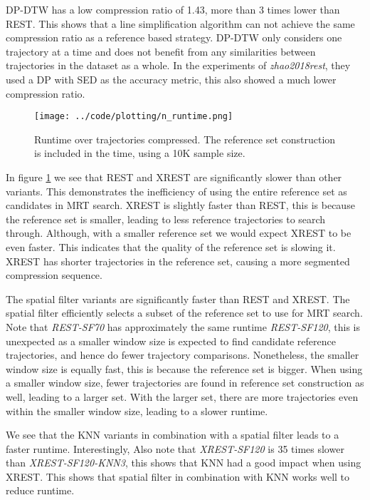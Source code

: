 DP-DTW has a low compression ratio of 1.43, more than 3 times lower than REST. This shows that a line simplification algorithm can not achieve the same compression ratio as a reference based strategy. DP-DTW only considers one trajectory at a time and does not benefit from any similarities between trajectories in the dataset as a whole. In the experiments of \textit{zhao2018rest}, they used a DP with SED as the accuracy metric, this also showed a much lower compression ratio.

\begin{figure}[h]
    \begin{minipage}{0.99\linewidth}
        \centering
        \texttt{[image: ../code/plotting/n\_runtime.png]}
        \caption{Runtime over trajectories compressed. The reference set construction is included in the time, using a 10K sample size.}
        \label{fig:n_runtime}
    \end{minipage}
\end{figure}

In figure \ref{fig:n_runtime} we see that REST and XREST are significantly slower than other variants. This demonstrates the inefficiency of using the entire reference set as candidates in MRT search. XREST is slightly faster than REST, this is because the reference set is smaller, leading to less reference trajectories to search through. Although, with a smaller reference set we would expect XREST to be even faster. This indicates that the quality of the reference set is slowing it. XREST has shorter trajectories in the reference set, causing a more segmented compression sequence.

The spatial filter variants are significantly faster than REST and XREST. The spatial filter efficiently selects a subset of the reference set to use for MRT search. Note that \textit{REST-SF70} has approximately the same runtime \textit{REST-SF120}, this is unexpected as a smaller window size is expected to find candidate reference trajectories, and hence do fewer trajectory comparisons. Nonetheless, the smaller window size is equally fast, this is because the reference set is bigger. When using a smaller window size, fewer trajectories are found in reference set construction as well, leading to a larger set. With the larger set, there are more trajectories even within the smaller window size, leading to a slower runtime.

We see that the KNN variants in combination with a spatial filter leads to a faster runtime. Interestingly, Also note that \textit{XREST-SF120} is 35 times slower than \textit{XREST-SF120-KNN3}, this shows that KNN had a good impact when using XREST. This shows that spatial filter in combination with KNN works well to reduce runtime.

